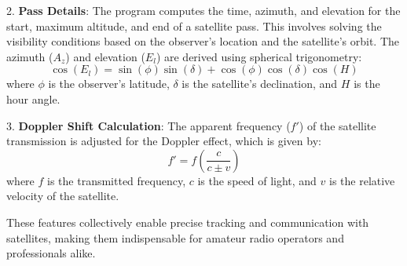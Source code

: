 2. \textbf{Pass Details}: The program computes the time, azimuth, and elevation for the start, maximum altitude, and end of a satellite pass. This involves solving the visibility conditions based on the observer's location and the satellite's orbit. The azimuth ($A_z$) and elevation ($E_l$) are derived using spherical trigonometry:
   \[
   \cos(E_l) = \sin(\phi) \sin(\delta) + \cos(\phi) \cos(\delta) \cos(H)
   \]
   where $\phi$ is the observer's latitude, $\delta$ is the satellite's declination, and $H$ is the hour angle.

3. \textbf{Doppler Shift Calculation}: The apparent frequency ($f'$) of the satellite transmission is adjusted for the Doppler effect, which is given by:
   \[
   f' = f \left( \frac{c}{c \pm v} \right)
   \]
   where $f$ is the transmitted frequency, $c$ is the speed of light, and $v$ is the relative velocity of the satellite.

These features collectively enable precise tracking and communication with satellites, making them indispensable for amateur radio operators and professionals alike.

